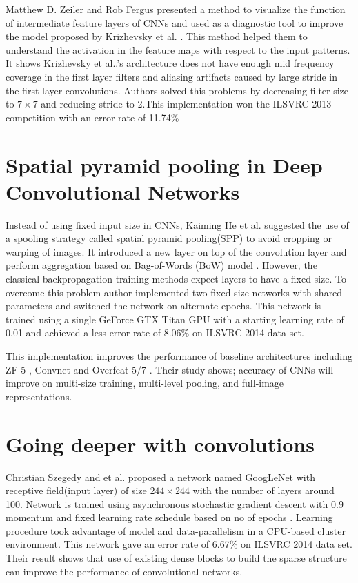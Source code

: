 \documentclass{article}
\begin{document}
Matthew D. Zeiler and Rob Fergus\cite{Zeiler2013} presented a method to visualize the function of intermediate feature layers of CNNs and used as a diagnostic tool to improve  the model proposed by Krizhevsky et al. \cite{Krizhevsky2012a}. This method helped  them  to understand  the activation in the feature maps with respect to the input patterns. It shows Krizhevsky et al..'s architecture does not have  enough mid frequency coverage in the first layer filters and aliasing artifacts caused by  large stride in the first layer convolutions. Authors solved this problems by decreasing filter size to $7\times7$ and reducing stride to 2.This implementation won the  ILSVRC 2013 competition with an error rate of 11.74\%



\section{Spatial pyramid pooling in Deep Convolutional Networks}
Instead of using fixed input size in CNNs, Kaiming He et al. \cite{He2014} suggested  the use of a spooling strategy called  spatial pyramid pooling(SPP)\cite{Grauman2005}\cite{1641019} to avoid cropping or warping of  images. It introduced a new layer on top of the convolution layer and perform aggregation  based on Bag-of-Words (BoW) model \cite{Sivic2003}. However, the classical backpropagation training methods expect layers to have a fixed   size. To overcome this problem author implemented two fixed size networks with shared parameters and switched the network on alternate epochs. This network is trained using a single GeForce GTX Titan GPU with a starting  learning rate of 0.01 and achieved  a less  error rate of 8.06\% on  ILSVRC 2014 data set. 
\par 
This implementation improves the performance of baseline architectures including ZF-5\cite{Zeiler2013} , Convnet \cite{Krizhevsky2012a} and Overfeat-5/7 \cite{Sermanet2013}. Their study shows; accuracy of CNNs will improve on multi-size training, multi-level pooling, and full-image representations. 
%




\section{Going deeper with convolutions }
Christian Szegedy and et al. \cite{Szegedy} proposed a network named GoogLeNet with receptive field(input layer) of size $244\times244$ with the number of layers around 100. Network is trained using asynchronous stochastic gradient descent with 0.9 momentum and fixed learning rate schedule based on  no of epochs 
. Learning procedure took advantage of  model and data-parallelism in a CPU-based cluster environment. This network gave an error rate of  6.67\%  on  ILSVRC 2014 data set. Their result shows that use of existing dense  blocks to  build the sparse structure can improve the  performance of convolutional networks.
\end{document}
